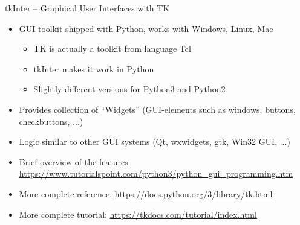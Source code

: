 \begin{frame}{tkInter -- Graphical User Interfaces with TK}
%
\begin{itemize}
\item GUI toolkit shipped with Python, works with Windows, Linux, Mac
	\begin{itemize}
	\item TK is actually a toolkit from language Tcl
	\item tkInter makes it work in Python
	\item Slightly different versions for Python3 and Python2
	\end{itemize}
\item Provides collection of \enquote{Widgets} (GUI-elements such as windows, buttons, checkbuttons, ...)
\item Logic similar to other GUI systems (\eg Qt, wxwidgets, gtk, Win32 GUI, ...)
\item Brief overview of the features: \url{https://www.tutorialspoint.com/python3/python_gui_programming.htm}
\item More complete reference: \url{https://docs.python.org/3/library/tk.html}
\item More complete tutorial: \url{https://tkdocs.com/tutorial/index.html}
\end{itemize}
%
\end{frame}


